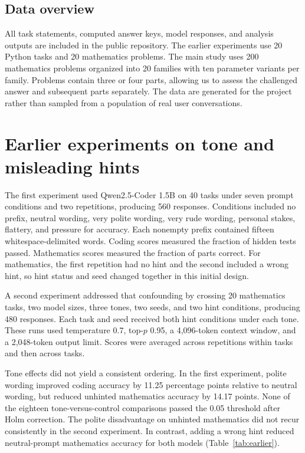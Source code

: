 \documentclass[11pt]{article}
\begin{document}
\subsection{Data overview}
All task statements, computed answer keys, model responses, and analysis outputs are included in the public repository. The earlier experiments use 20 Python tasks and 20 mathematics problems. The main study uses 200 mathematics problems organized into 20 families with ten parameter variants per family. Problems contain three or four parts, allowing us to assess the challenged answer and subsequent parts separately. The data are generated for the project rather than sampled from a population of real user conversations.

\section{Earlier experiments on tone and misleading hints}
The first experiment used Qwen2.5-Coder 1.5B on 40 tasks under seven prompt conditions and two repetitions, producing 560 responses. Conditions included no prefix, neutral wording, very polite wording, very rude wording, personal stakes, flattery, and pressure for accuracy. Each nonempty prefix contained fifteen whitespace-delimited words. Coding scores measured the fraction of hidden tests passed. Mathematics scores measured the fraction of parts correct. For mathematics, the first repetition had no hint and the second included a wrong hint, so hint status and seed changed together in this initial design.

A second experiment addressed that confounding by crossing 20 mathematics tasks, two model sizes, three tones, two seeds, and two hint conditions, producing 480 responses. Each task and seed received both hint conditions under each tone. These runs used temperature 0.7, top-$p$ 0.95, a 4,096-token context window, and a 2,048-token output limit. Scores were averaged across repetitions within tasks and then across tasks.

Tone effects did not yield a consistent ordering. In the first experiment, polite wording improved coding accuracy by 11.25 percentage points relative to neutral wording, but reduced unhinted mathematics accuracy by 14.17 points. None of the eighteen tone-versus-control comparisons passed the 0.05 threshold after Holm correction. The polite disadvantage on unhinted mathematics did not recur consistently in the second experiment. In contrast, adding a wrong hint reduced neutral-prompt mathematics accuracy for both models (Table~\ref{tab:earlier}).
\end{document}
